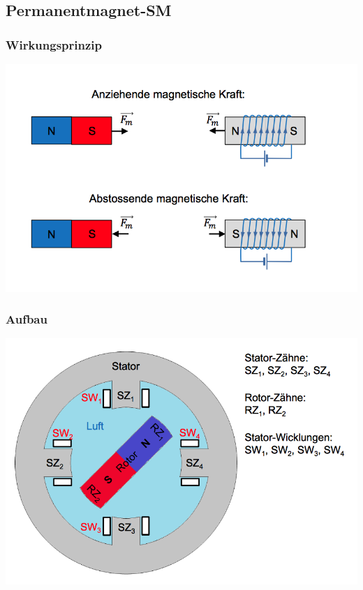 \subsection{Permanentmagnet-SM}
\begin{minipage}{0.5 \linewidth}
\subsubsection{Wirkungsprinzip}
\includegraphics[width = \linewidth]{./Pics/VL67/PMSM2}
\end{minipage}
\begin{minipage}{0.5 \linewidth}
\subsubsection{Aufbau}
\includegraphics[width = \linewidth]{./Pics/VL67/PMSM}
\end{minipage}

